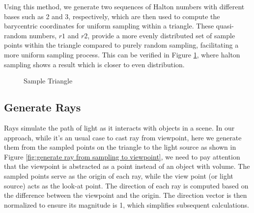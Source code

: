 \documentclass[11pt, a4paper,oneside,chapterprefix=false]{scrbook}
\begin{document}
Using this method, we generate two sequences of Halton numbers with different bases such as 2 and 3, respectively, which are then used to compute the barycentric coordinates for uniform sampling within a triangle. These quasi-random numbers, \( r1 \) and \( r2 \), provide a more evenly distributed set of sample points within the triangle compared to purely random sampling, facilitating a more uniform sampling process. This can be verified in Figure \ref{fig:sample triangle}, where halton sampling shows a result which is closer to even distribution.  

\begin{figure}[H]
    \centering
      \label{fig:uniform sampling} 
     \label{fig:halton sampling}
    \caption{Sample Triangle}
    \label{fig:sample triangle}
\end{figure}



\subsection{Generate Rays}

Rays simulate the path of light as it interacts with objects in a scene. In our approach, while it's an usual case to cast ray from viewpoint, here we generate them from the sampled points on the triangle to the light source as shown in Figure \ref{fig:generate ray from sampling to viewpoint}, we need to pay attention that the viewpoint is abstracted as a point instead of an object with volume. The sampled points serve as the origin of each ray, while the view point (or light source) acts as the look-at point. The direction of each ray is computed based on the difference between the viewpoint and the origin. The direction vector is then normalized to ensure its magnitude is 1, which simplifies subsequent calculations.
\end{document}
